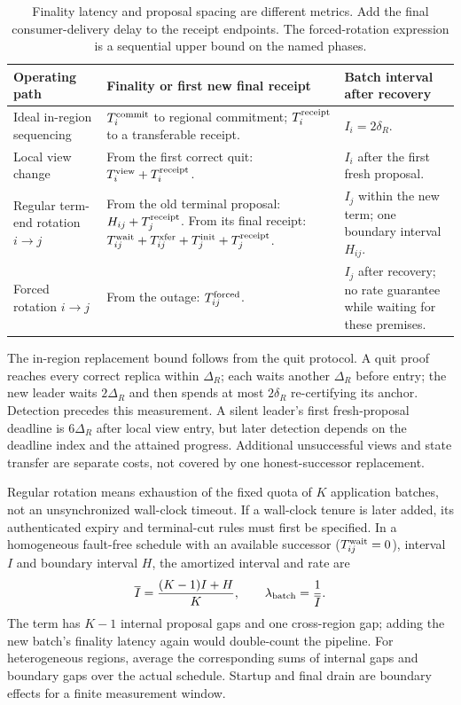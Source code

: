 \documentclass[11pt,a4paper,onecolumn]{article}
\newcounter{protocol}
\begin{document}
\begin{table}[H]\centering\small
\begin{tabularx}{\linewidth}{@{}>{\raggedright\arraybackslash}p{.24\linewidth}Y Y@{}}
\toprule
Operating path & Finality or first new final receipt & Batch interval after recovery\\
\midrule
Ideal in-region sequencing & $T_i^{\rm commit}$ to regional commitment;
$T_i^{\rm receipt}$ to a transferable receipt. & $I_i=2\delta_R$.\\
\addlinespace[3pt]
Local view change & From the first correct quit:
$T_i^{\rm view}+T_i^{\rm receipt}$. & $I_i$ after the first fresh proposal.\\
\addlinespace[3pt]
Regular term-end rotation $i\to j$ & From the old terminal proposal:
$H_{ij}+T_j^{\rm receipt}$. From its final receipt: $T_{ij}^{\rm wait}+T_{ij}^{\rm xfer}+T_j^{\rm init}+T_j^{\rm receipt}$. &
$I_j$ within the new term; one boundary interval $H_{ij}$.\\
\addlinespace[3pt]
Forced rotation $i\to j$ & From the outage:
$T_{ij}^{\rm forced}$.
& $I_j$ after recovery; no rate guarantee while waiting for these premises.\\
\bottomrule
\end{tabularx}
\caption{Finality latency and proposal spacing are different metrics.
Add the final consumer-delivery delay to the receipt endpoints.
The forced-rotation expression is a sequential upper bound on the named
phases.}
\label{tab:operating-paths}
\end{table}

The in-region replacement bound follows from the quit protocol. A quit proof
reaches every correct replica within $\Delta_R$; each waits another
$\Delta_R$ before entry; the new leader waits $2\Delta_R$ and then spends
at most $2\delta_R$ re-certifying its anchor. Detection precedes this
measurement. A silent leader's first fresh-proposal deadline is
$6\Delta_R$ after local view entry, but later detection depends on the
deadline index and the attained progress. Additional unsuccessful views
and state transfer are separate costs, not covered by one honest-successor
replacement.

Regular rotation means exhaustion of the fixed quota of $K$ application
batches, not an unsynchronized wall-clock timeout. If a wall-clock tenure
is later added, its authenticated expiry and terminal-cut rules must first
be specified. In a homogeneous fault-free schedule with an available successor
($T_{ij}^{\rm wait}=0$), interval $I$ and boundary interval $H$, the amortized interval and rate are
\[
 \overline I=\frac{(K-1)I+H}{K},
 \qquad \lambda_{\rm batch}=\frac{1}{\overline I}.
\]
The term has $K-1$ internal proposal gaps and one cross-region gap; adding
the new batch's finality latency again would double-count the pipeline.
For heterogeneous regions, average the corresponding sums of internal
gaps and boundary gaps over the actual schedule. Startup and final drain
are boundary effects for a finite measurement window.
\end{document}
